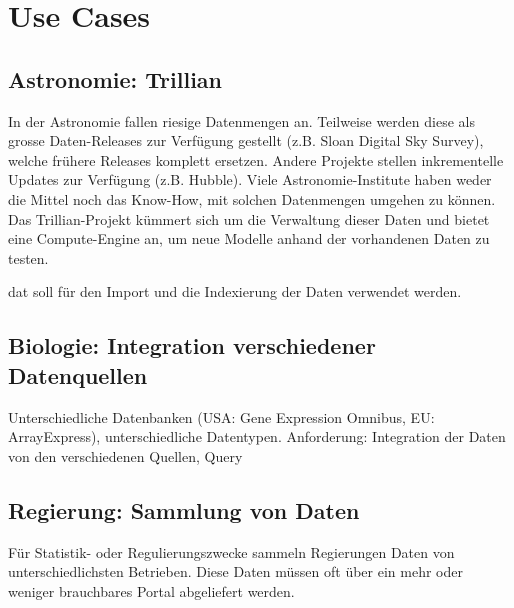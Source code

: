 

\section{Use Cases} %

\subsection{Astronomie: Trillian} 
In der Astronomie fallen riesige Datenmengen an. Teilweise werden diese als grosse Daten-Releases zur Verfügung gestellt (z.B. Sloan Digital Sky Survey), welche frühere Releases komplett ersetzen. Andere Projekte stellen inkrementelle Updates zur Verfügung (z.B. Hubble). Viele Astronomie-Institute haben weder die Mittel noch das Know-How, mit solchen Datenmengen umgehen zu können. Das Trillian-Projekt kümmert sich um die Verwaltung dieser Daten und bietet eine Compute-Engine an, um neue Modelle anhand der vorhandenen Daten zu testen.

dat soll für den Import und die Indexierung der Daten verwendet werden.

\subsection{Biologie: Integration verschiedener Datenquellen} 
Unterschiedliche Datenbanken (USA: Gene Expression Omnibus, EU: ArrayExpress), unterschiedliche Datentypen. Anforderung: Integration der Daten von den verschiedenen Quellen, Query

\xxx[Ausformulieren]

\subsection{Regierung: Sammlung von Daten} %
Für Statistik- oder Regulierungszwecke sammeln Regierungen Daten von unterschiedlichsten Betrieben. Diese Daten müssen oft über ein mehr oder weniger brauchbares Portal abgeliefert werden.

